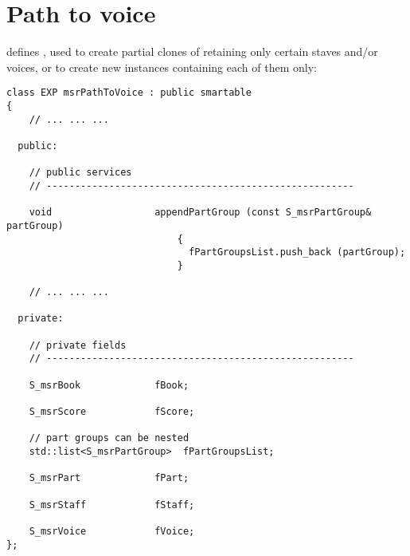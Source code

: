 



\chapter{Path to voice}\label{Path to voice}

 defines , used to create partial clones of  retaining only certain staves and/or voices, or to create new  instances containing each of them only:
\begin{lstlisting}[language=CPlusPlus]
class EXP msrPathToVoice : public smartable
{
	// ... ... ...

  public:

    // public services
    // ------------------------------------------------------

    void                  appendPartGroup (const S_msrPartGroup& partGroup)
                              {
                                fPartGroupsList.push_back (partGroup);
                              }

	// ... ... ...

  private:

    // private fields
    // ------------------------------------------------------

    S_msrBook             fBook;

    S_msrScore            fScore;

    // part groups can be nested
    std::list<S_msrPartGroup>  fPartGroupsList;

    S_msrPart             fPart;

    S_msrStaff            fStaff;

    S_msrVoice            fVoice;
};
\end{lstlisting}

